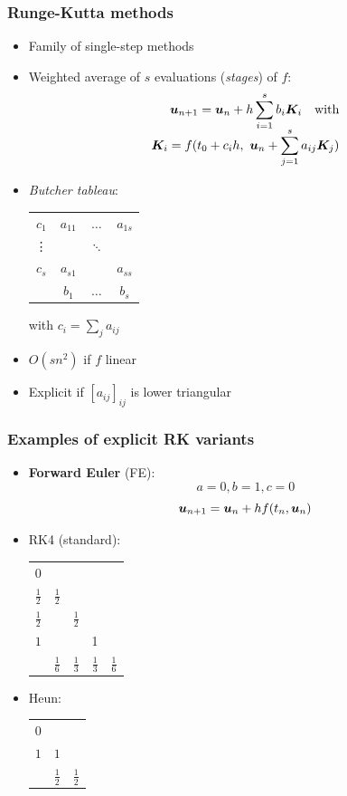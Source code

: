 \documentclass{beamer}
\begin{document}
\begin{frame} %
	\frametitle{Runge-Kutta methods}
	\begin{itemize}
		\item Family of single-step methods
		\item Weighted average of $s$ evaluations (\textit{stages}) of $f$: \\[-20pt]
		\begin{align*}
			\boldsymbol u_{n+1} = \boldsymbol u_{n} + h \sum_{i=1}^s b_i \boldsymbol K_i \quad \text{with} \\[-5pt]
			\boldsymbol K_i = f(t_0 + c_i h, \ \boldsymbol u_n + \sum_{j=1}^s a_{ij} \boldsymbol K_j)
		\end{align*}
		\pause
		\vspace{-20pt}
		\item \textit{Butcher tableau}:
		\begin{center}
			\begin{tabular}{c|ccc}
				$c_1$ & $a_{11}$ & $\dots$ & $a_{1s}$ \\
				\vdots & & $\ddots$ & \\
				$c_s$ & $a_{s1}$ & & $a_{ss}$ \\
				\hline
				& $b_1$ & $\dots$ & $b_s$
			\end{tabular}
		\hspace{30pt} with $c_i = \sum_j a_{ij}$
		\pause
		\end{center}
		\item $O(s n^2)$ if $f$ linear
		\item Explicit if $[a_{ij}]_{ij}$ is lower triangular
	\end{itemize}
\end{frame}


\begin{frame} %
	\frametitle{Examples of explicit RK variants}
	\begin{itemize}
		\item \textbf{Forward Euler} (FE):
		$$ a = 0, b = 1, c = 0 $$
		$$ \boldsymbol u_{n+1} = \boldsymbol u_{n} + h f(t_n, \boldsymbol u_n) $$
		\item RK4 (standard):
		\begin{tabular}{c|cccc}
			$0$ & & & & \\
			$\frac 1 2$ & $\frac 1 2$ & & & \\
			$\frac 1 2$ & & $\frac 1 2$ & & \\
			$1$ & & & 1 & \\
			\hline
			& $\frac 1 6$ & $\frac 1 3$ & $\frac 1 3$ & $\frac 1 6$
			\end{tabular}
		\item Heun:
		\begin{tabular}{c|cc}
			$0$ &     & \\
			$1$ & $1$ & \\
			\hline
			    & $\frac 1 2$ & $\frac 1 2$
			\end{tabular}	
	\end{itemize}
\end{frame}
\end{document}
